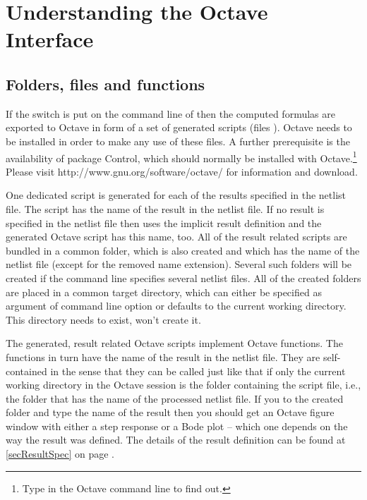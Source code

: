 \chapter{Understanding the Octave Interface}
\label{secOctaveInterface}

\section{Folders, files and functions}

If the switch  is put on the command line of \linnet{} then the
computed formulas are exported to Octave in form of a set of generated
scripts (files ). Octave needs to be installed in order to make
any use of these files. A further prerequisite is the availability of
package Control, which should normally be installed with
Octave.\footnote{Type  in the Octave command line to find
out.} Please visit http://www.gnu.org/software/octave/ for information and
download.

One dedicated script is generated for each of the results specified in the
netlist file. The script has the name of the result in the netlist file.
If no result is specified in the netlist file then \linnet{} uses the
implicit result definition  and the generated Octave
script has this name, too. All of the result related scripts are bundled
in a common folder, which is also created and which has the name of the
netlist file (except for the removed name extension). Several such folders
will be created if the \linnet{} command line specifies several netlist
files. All of the created folders are placed in a common target directory,
which can either be specified as argument of command line option 
or defaults to the current working directory. This directory needs to
exist, \linnet{} won't create it.

The generated, result related Octave scripts implement Octave functions.
The functions in turn have the name of the result in the netlist file.
They are self-contained in the sense that they can be called just like
that if only the current working directory in the Octave session is the
folder containing the script file, i.e., the folder that has the name of
the processed netlist file. If you  to the created folder and
type the name of the result then you should get an Octave figure window
with either a step response or a Bode plot -- which one depends on the way
the result was defined. The details of the result definition can be found
at \ref{secResultSpec} on page \pageref{secResultSpec}.

